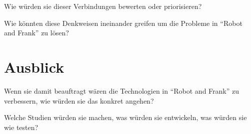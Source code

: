 \documentclass[sigchi-a, authorversion]{acmart}
\begin{document}
Wie würden sie dieser Verbindungen bewerten oder priorisieren?

Wie könnten diese Denkweisen ineinander greifen um die Probleme in ``Robot and Frank'' zu lösen?

\section{Ausblick}

Wenn sie damit beauftragt wären die Technologien in ``Robot and Frank'' zu verbessern, wie würden sie das konkret angehen?

Welche Studien würden sie machen, was würden sie entwickeln, was würden sie wie testen?






\end{document}
